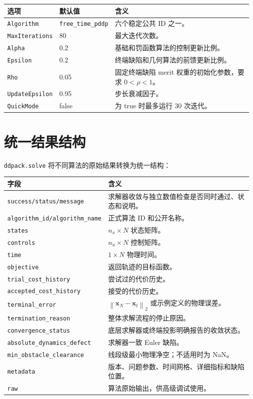 \documentclass[UTF8,zihao=-4,openany,fontset=fandol]{ctexbook}
\newcommand{\code}[1]{\nolinkurl{#1}}
\newcommand{\normtwo}[1]{\left\lVert #1\right\rVert_2}
\begin{document}
\begin{longtable}{p{}p{}p{}}
\toprule
选项 & 默认值 & 含义\\
\midrule
\endhead
\code{Algorithm} & \code{free_time_pddp} & 六个稳定公共 ID 之一。\\
\code{MaxIterations} & 80 & 最大迭代次数。\\
\code{Alpha} & 0.2 & 基础和罚函数算法的控制更新比例。\\
\code{Epsilon} & 0.2 & 终端缺陷和几何算法的前馈更新比例。\\
\code{Rho} & 0.05 & 固定终端缺陷 merit 权重的初始化参数，要求 $0<\rho<1$。\\
\code{UpdateEpsilon} & 0.95 & 步长衰减因子。\\
\code{QuickMode} & false & 为 true 时最多运行 30 次迭代。\\
\bottomrule
\end{longtable}

\section{统一结果结构}

\code{ddpack.solve} 将不同算法的原始结果转换为统一结构：

\begin{longtable}{p{}p{}}
\toprule
字段 & 含义\\
\midrule
\endhead
\code{success/status/message} & 求解器收敛与独立数值检查是否同时通过、状态和说明。\\
\code{algorithm_id/algorithm_name} & 正式算法 ID 和公开名称。\\
\code{states} & $n_x\times N$ 状态矩阵。\\
\code{controls} & $n_u\times N$ 控制矩阵。\\
\code{time} & $1\times N$ 物理时间。\\
\code{objective} & 返回轨迹的目标函数。\\
\code{trial_cost_history} & 尝试过的代价历史。\\
\code{accepted_cost_history} & 接受的代价历史。\\
\code{terminal_error} & $\normtwo{\bm{x}_N-\bm{x}_{\mathrm f}}$ 或示例定义的物理误差。\\
\code{termination_reason} & 整体求解流程的停止原因。\\
\code{convergence_status} & 底层求解器或终端投影明确报告的收敛状态。\\
\code{absolute_dynamics_defect} & 求解器一致 Euler 缺陷。\\
\code{min_obstacle_clearance} & 线段级最小物理净空；不适用时为 NaN。\\
\code{metadata} & 版本、问题参数、时间网格、详细指标和缺陷位置。\\
\code{raw} & 算法原始输出，供高级调试使用。\\
\bottomrule
\end{longtable}
\end{document}
